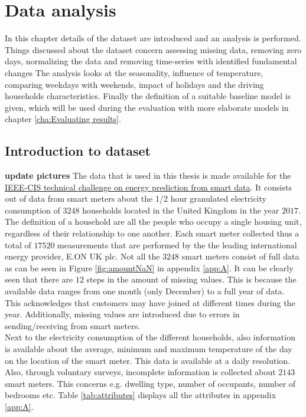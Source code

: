 \chapter{Data analysis}
\label{cha:Data analysis}
In this chapter details of the dataset are introduced and an analysis is performed. Things discussed about the dataset concern assessing missing data, removing zero days, normalizing the data and removing time-series with identified fundamental changes The analysis looks at the seasonality,  influence of temperature, comparing weekdays with weekends, impact of holidays and the driving households characteristics. Finally the definition of a suitable baseline model is given, which will be used during the evaluation with more elaborate models in chapter \ref{cha:Evaluating results}.


\section{Introduction to dataset}
\textbf{update pictures}
The data that is used in this thesis is made available for the \href{https://ieee-dataport.org/competitions/ieee-cis-technical-challenge-energy-prediction-smart-meter-data}{IEEE-CIS technical challenge on energy prediction from smart data}. It consists out of data from smart meters about the 1/2 hour granulated electricity consumption of $3248$ households located in the United Kingdom in the year $2017$. The definition of a household are all the people who occupy a single housing unit, regardless of their relationship to one another. Each smart meter collected thus a total of $17520$ measurements that are performed by the the leading international energy provider, E.ON UK plc. Not all the $3248$ smart meters consist of full data as can be seen in Figure \ref{fig:amountNaN} in appendix \ref{app:A}. It can be clearly seen that there are $12$ steps in the amount of missing values. This is because the available data ranges from one month (only December) to a full year of data. This acknowledges that customers may have joined at different times during the year. Additionally, missing values are introduced due to errors in sending/receiving from smart meters.\\
Next to the electricity consumption of the different households, also information is available about the average, minimum and maximum temperature of the day on the location of the smart meter. This data is available at a daily resolution. Also, through voluntary surveys, incomplete information is collected about $2143$ smart meters. This concerns e.g. dwelling type, number of occupants, number of bedrooms etc. Table \ref{tab:attributes} displays all the attributes in appendix \ref{app:A}.\\

